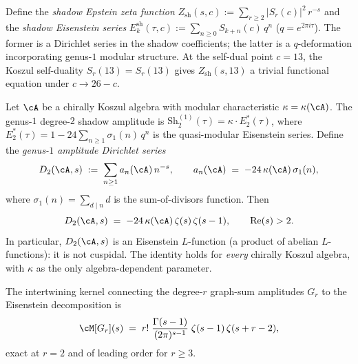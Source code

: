 \begin{construction}
\label{constr:shadow-epstein-eisenstein}
Define the \emph{shadow Epstein zeta function}
$Z_{\mathrm{sh}}(s, c) := \sum_{r \geq 2} |S_r(c)|^2\,r^{-s}$
and the \emph{shadow Eisenstein series}
$E_k^{\mathrm{sh}}(\tau, c) := \sum_{n \geq 0} S_{k+n}(c)\,q^n$
($q = e^{2\pi i \tau}$). The former is a Dirichlet series in the shadow coefficients; the latter is a $q$-deformation incorporating genus-$1$ modular structure. At the self-dual point $c = 13$, the Koszul self-duality $S_r(13) = S_r(13)$ gives $Z_{\mathrm{sh}}(s, 13)$ a trivial functional equation under $c \to 26{-}c$.
\end{construction}

\begin{theorem}
\label{thm:shadow-eisenstein}
\ClaimStatusProvedElsewhere
{}
Let $\cA$ be a chirally Koszul algebra with modular
characteristic $\kappa = \kappa(\cA)$. The genus-$1$
degree-$2$ shadow amplitude is
$\mathrm{Sh}_2^{(1)}(\tau) = \kappa \cdot E_2^*(\tau)$,
where $E_2^*(\tau) = 1 - 24\sum_{n \ge 1}\sigma_1(n)\,q^n$
is the quasi-modular Eisenstein series. Define the
\emph{genus-$1$ amplitude Dirichlet series}
\begin{equation}\label{eq:genus1-amplitude-dirichlet}
 D_2(\cA, s)
 \;:=\;
 \sum_{n \ge 1} a_n(\cA)\,n^{-s},
 \qquad
 a_n(\cA) \;=\; -24\,\kappa(\cA)\,\sigma_1(n),
\end{equation}
where $\sigma_1(n) = \sum_{d \mid n} d$ is the
sum-of-divisors function. Then
\begin{equation}\label{eq:shadow-eisenstein-identity}
 D_2(\cA, s)
 \;=\;
 -24\,\kappa(\cA)\,\zeta(s)\,\zeta(s-1),
 \qquad \operatorname{Re}(s) > 2.
\end{equation}
In particular, $D_2(\cA, s)$ is an Eisenstein $L$-function
\textup{(}a product of abelian $L$-functions\textup{)}: it is
not cuspidal. The identity holds for \emph{every} chirally
Koszul algebra, with $\kappa$ as the only algebra-dependent
parameter.

The intertwining kernel connecting the degree-$r$ graph-sum
amplitudes $G_r$ to the Eisenstein decomposition is
\begin{equation}\label{eq:intertwining-kernel}
 \cM[G_r](s)
 \;=\;
 r!\;\frac{\Gamma(s-1)}{(2\pi)^{s-1}}
 \;\zeta(s-1)\,\zeta(s+r-2),
\end{equation}
exact at $r = 2$ and of leading order for $r \ge 3$.
\end{theorem}

